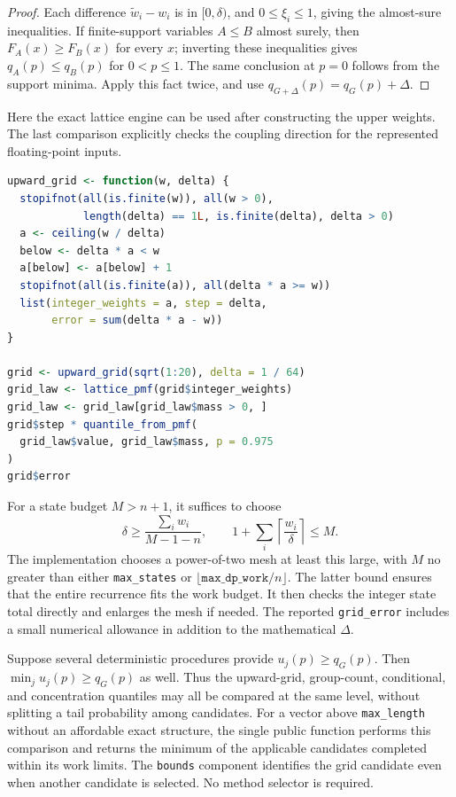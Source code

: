 \documentclass[11pt,letterpaper]{article}
\numberwithin{equation}{section}
\theoremstyle{definition}
\theoremstyle{remark}
\begin{document}
\begin{proof}
Each difference $\widetilde w_i-w_i$ is in $[0,\delta)$, and
$0\le\xi_i\le1$, giving the almost-sure inequalities.  If finite-support
variables $A\le B$ almost surely, then $F_A(x)\ge F_B(x)$ for every $x$;
inverting these inequalities gives $q_A(p)\le q_B(p)$ for $0<p\le1$.
The same conclusion at $p=0$ follows from the support minima.  Apply this
fact twice, and use $q_{G+\Delta}(p)=q_G(p)+\Delta$.
\end{proof}

Here the exact lattice engine can be used after constructing the upper
weights.  The last comparison explicitly checks the coupling direction
for the represented floating-point inputs.
\begin{lstlisting}[language=R]
upward_grid <- function(w, delta) {
  stopifnot(all(is.finite(w)), all(w > 0),
            length(delta) == 1L, is.finite(delta), delta > 0)
  a <- ceiling(w / delta)
  below <- delta * a < w
  a[below] <- a[below] + 1
  stopifnot(all(is.finite(a)), all(delta * a >= w))
  list(integer_weights = a, step = delta,
       error = sum(delta * a - w))
}

grid <- upward_grid(sqrt(1:20), delta = 1 / 64)
grid_law <- lattice_pmf(grid$integer_weights)
grid_law <- grid_law[grid_law$mass > 0, ]
grid$step * quantile_from_pmf(
  grid_law$value, grid_law$mass, p = 0.975
)
grid$error
\end{lstlisting}

For a state budget $M>n+1$, it suffices to choose
\[
 \delta\ge\frac{\sum_iw_i}{M-1-n},
 \qquad
 1+\sum_i\left\lceil\frac{w_i}{\delta}\right\rceil\le M.
\]
The implementation chooses a power-of-two mesh at least this large,
with $M$ no greater than either \texttt{max\_states} or
$\lfloor\texttt{max\_dp\_work}/n\rfloor$.  The latter bound ensures
that the entire recurrence fits the work budget.  It then checks the
integer state total directly and enlarges the mesh if needed.  The
reported \texttt{grid\_error} includes a small numerical allowance in
addition to the mathematical $\Delta$.

Suppose several deterministic procedures provide $u_j(p)\ge q_G(p)$.
Then $\min_j u_j(p)\ge q_G(p)$ as well. Thus the upward-grid, group-count,
conditional, and concentration quantiles may all be compared at the same
level, without splitting a tail probability among candidates. For a vector
above \texttt{max\_length} without an affordable exact structure, the
single public function performs this comparison and returns the minimum
of the applicable candidates completed within its work limits. The
\texttt{bounds} component identifies the grid candidate even when another
candidate is selected. No method selector is required.
\end{document}
